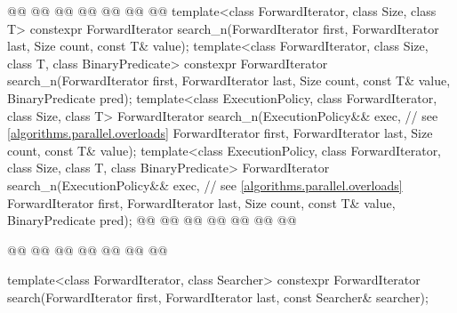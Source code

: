 \begin{codeblock}
{    @@
        @@
      @@
      @@
        @@
              @@
  @\added{\}}@
  template<class ForwardIterator, class Size, class T>
    constexpr ForwardIterator
      search_n(ForwardIterator first, ForwardIterator last,
               Size count, const T& value);
  template<class ForwardIterator, class Size, class T, class BinaryPredicate>
    constexpr ForwardIterator
      search_n(ForwardIterator first, ForwardIterator last,
               Size count, const T& value,
               BinaryPredicate pred);
  template<class ExecutionPolicy, class ForwardIterator, class Size, class T>
    ForwardIterator
      search_n(ExecutionPolicy&& exec, // see \ref{algorithms.parallel.overloads}
               ForwardIterator first, ForwardIterator last,
               Size count, const T& value);
  template<class ExecutionPolicy, class ForwardIterator, class Size, class T,
           class BinaryPredicate>
    ForwardIterator
      search_n(ExecutionPolicy&& exec, // see \ref{algorithms.parallel.overloads}
               ForwardIterator first, ForwardIterator last,
               Size count, const T& value,
               BinaryPredicate pred);
  @@
    @@
        @@
      @@
      @@
                @@
                @@

    @@
        @@
      @@
      @@
        @@
                @@
  @\added{\}}@

  template<class ForwardIterator, class Searcher>
    constexpr ForwardIterator
      search(ForwardIterator first, ForwardIterator last, const Searcher& searcher);

}
\end{codeblock}

